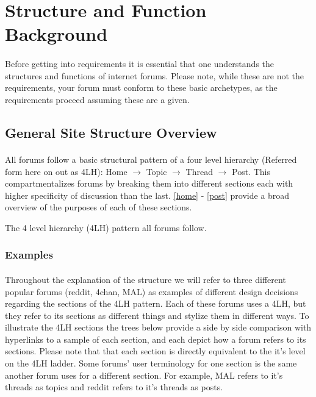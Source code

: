 \documentclass[]{article}
\begin{document}
\section{Structure and Function Background}
\paragraph{}
Before getting into requirements it is essential that one understands the structures and functions of internet forums. Please note, while these are not the requirements, your forum must conform to these basic archetypes, as the requirements proceed assuming these are a given. 

\subsection{General Site Structure Overview}
\begin{minipage}{0.65\textwidth}
\paragraph{}
All forums follow a basic structural pattern of a four level hierarchy (Referred form here on out as 4LH): Home $\to$ Topic $\to$ Thread $\to$ Post. This compartmentalizes forums by breaking them into different sections each with higher specificity of discussion than the last. \ref{home} - \ref{post} provide a broad overview of the purposes of each of these sections.
\end{minipage}%
\hspace{0.5cm}
\vline
\hspace{0.5cm}
\begin{minipage}{0.35\textwidth}
\vspace{0.5 cm}
The 4 level hierarchy (4LH) pattern all forums follow.  
\end{minipage}%

\newpage

\subsubsection{Examples}\label{StructEx}
\paragraph{}
Throughout the explanation of the structure we will refer to three different popular forums (reddit, 4chan, MAL) as examples of different design decisions regarding the sections of the 4LH pattern. Each of these forums uses a 4LH, but they refer to its sections as different things and stylize them in different ways. To illustrate the 4LH sections the trees below provide a side by side comparison with hyperlinks to a sample of each section, and each depict how a forum refers to its sections. Please note that that each section is directly equivalent to the it's level on the 4LH ladder. Some forums' user terminology for one section is the same another forum uses for a different section. For example, MAL refers to it's threads as topics and reddit refers to it's threads as posts.
\end{document}

